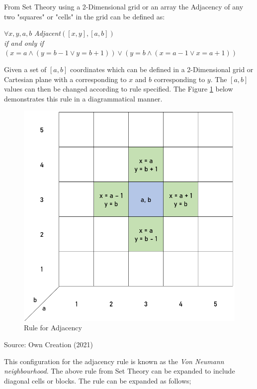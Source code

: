 From Set Theory using a 2-Dimensional grid or an array the Adjacency of any two "squares" or "cells" in the grid can be defined as:\cite{aima}
\begin{center}
$\forall x, y, a, b$ \textit{Adjacent}$([x, y], [a, b])$\\\textit{if and only if}\\$(x = a \land (y = b - 1 \lor y = b + 1)) \lor (y = b \land (x = a - 1 \lor x = a + 1))$
\end{center}
Given a set of $[a, b]$ coordinates which can be defined in a 2-Dimensional grid or Cartesian plane with a corresponding to $x$ and $b$ corresponding to $y$. The $[a, b]$ values can then be changed according to rule specified. The Figure \ref{fig:ruleadj} below demonstrates this rule in a diagrammatical manner.
\begin{figure}[H]
\centering
\includegraphics[scale=0.5]{Figures/Chapter2/adjacent}
\caption{Rule for Adjacency}
\label{fig:ruleadj}
\end{figure}
\begin{center}
Source: Own Creation (2021)
\end{center}
This configuration for the adjacency rule is known as the \textit{Von Neumann neighbourhood}\cite{ca}. The above rule from Set Theory can be expanded to include diagonal cells or blocks. The rule can be expanded as follows;
